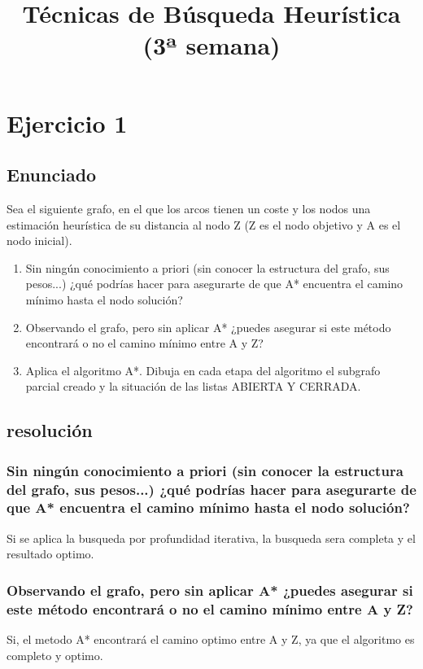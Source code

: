 \documentclass[a4paper,10pt]{article}
\title{Técnicas de Búsqueda Heurística (3ª semana)}
\begin{document}
\maketitle
\pagebreak
\section{Ejercicio 1}
\subsection{Enunciado}
Sea el siguiente grafo, en el que los arcos tienen un coste y los nodos una estimación
heurística de su distancia al nodo Z (Z es el nodo objetivo y A es el nodo inicial).
\begin{enumerate}
	\item Sin ningún conocimiento a priori (sin conocer la estructura del grafo, sus pesos...) ¿qué podrías hacer para asegurarte de que A* encuentra el camino mínimo hasta el nodo solución?
	\item Observando el grafo, pero sin aplicar A* ¿puedes asegurar si este método encontrará o no el camino mínimo entre A y Z?
	\item Aplica el algoritmo A*. Dibuja en cada etapa del algoritmo el subgrafo parcial creado y la situación de las listas ABIERTA Y CERRADA.
\end{enumerate}
\subsection{resolución}
\subsubsection{Sin ningún conocimiento a priori (sin conocer la estructura del grafo, sus pesos...) ¿qué podrías hacer para asegurarte de que A* encuentra el camino mínimo hasta el nodo solución?}
Si se aplica la busqueda por profundidad iterativa, la busqueda sera completa y el resultado optimo.
\subsubsection{Observando el grafo, pero sin aplicar A* ¿puedes asegurar si este método encontrará o no el camino mínimo entre A y Z?}
Si, el metodo A* encontrará el camino optimo entre A y Z, ya que el algoritmo es completo y optimo.
\end{document}
